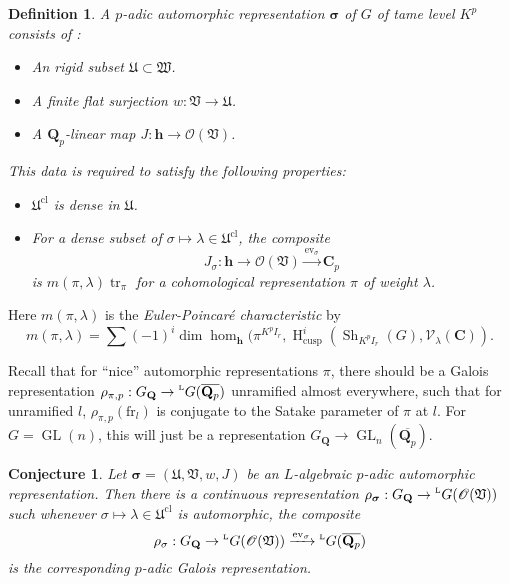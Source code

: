 \documentclass[oneside]{amsart}
\DeclareMathOperator{\GL}{GL}
\DeclareMathOperator{\h}{H}
\DeclareMathOperator{\shimura}{Sh}
\DeclareMathOperator{\trace}{tr}
\newcommand{\dC}{\mathbf{C}}
\newcommand{\dQ}{\mathbf{Q}}
\newcommand{\dsigma}{{\bm\sigma}}
\newcommand{\fU}{\mathfrak{U}}
\newcommand{\fV}{\mathfrak{V}}
\newcommand{\fW}{\mathfrak{W}}
\newcommand{\sO}{\mathscr{O}}
\newcommand{\sV}{\mathscr{V}}
\newcommand{\arithfrob}{\mathrm{fr}}
\newcommand{\classical}{\mathrm{cl}}
\newcommand{\cusp}{\mathrm{cusp}}
\newcommand{\hida}{\mathbf{h}}
\newcommand{\langlands}[1]{\prescript{\textnormal{\tiny L}}{}{#1}}
\newtheorem*{conjecture*}{Conjecture}
\newtheorem*{definition*}{Definition}
\begin{document}
\begin{definition*}
A \emph{$p$-adic automorphic representation $\dsigma$ of $G$ of tame level 
$K^p$} consists of :
\begin{itemize}
  \item An rigid subset $\fU\subset \fW$. 
  \item A finite flat surjection $w:\fV\to \fU$. 
  \item A $\dQ_p$-linear map $J:\hida\to \sO(\fV)$.
\end{itemize}
This data is required to satisfy the following properties:
\begin{itemize}
  \item $\fU^\classical$ is dense in $\fU$. 
  \item For a dense subset of $\sigma\mapsto\lambda\in\fU^\classical$, the 
    composite 
    \[
      J_\sigma:\hida \to \sO(\fV) \xrightarrow{\mathrm{ev}_\sigma} \dC_p
    \]
    is $m(\pi,\lambda) \trace_\pi$ for a cohomological representation $\pi$ of 
    weight $\lambda$. 
\end{itemize}
\end{definition*}
Here $m(\pi,\lambda)$ is the \emph{Euler-Poincar\'e characteristic} 
by 
\[
  m(\pi,\lambda) = \sum (-1)^i \dim\hom_\hida(\pi^{K^p I_r},\h_\cusp^i(\shimura_{K^p I_r}(G),\sV_\lambda(\dC)) .
\]

Recall that for ``nice'' automorphic representations $\pi$, there should 
be a Galois representation 
$\rho_{\pi,p}:G_\dQ\to \langlands G(\overline{\dQ_p})$ unramified almost 
everywhere, such that for unramified $l$, 
$\rho_{\pi,p}(\arithfrob_l)$ is conjugate to the Satake parameter of $\pi$ 
at $l$. For $G=\GL(n)$, this will just be a representation 
$G_\dQ\to \GL_n(\overline{\dQ_p})$. 

\begin{conjecture*}
Let $\dsigma=(\fU,\fV,w,J)$ be an $L$-algebraic $p$-adic automorphic 
representation. Then there is a continuous representation 
$\rho_\dsigma:G_\dQ\to \langlands G(\sO(\fV))$ such whenever 
$\sigma\mapsto \lambda\in \fU^\classical$ is automorphic, the composite 
\[
  \rho_\sigma:G_\dQ\to \langlands G(\sO(\fV)) \xrightarrow{\mathrm{ev}_\sigma} \langlands G(\overline{\dQ_p}) 
\]
is the corresponding $p$-adic Galois representation. 
\end{conjecture*}
\end{document}
